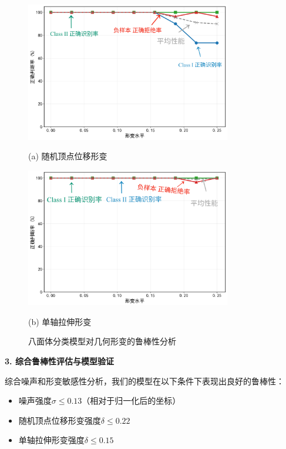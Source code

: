     \begin{figure}[H]
        \centering
\begin{minipage}{\textwidth}
    \centering
    \includegraphics[width=0.8\textwidth]{figures2/robustness/octahedron_robustness_random_vertex_disp.png}
    \caption*{(a) 随机顶点位移形变}
\end{minipage}

\begin{minipage}{\textwidth}
    \centering
    \includegraphics[width=0.8\textwidth]{figures2/robustness/octahedron_robustness_uniaxial_stretch.png}
    \caption*{(b) 单轴拉伸形变}
\end{minipage}
\caption{八面体分类模型对几何形变的鲁棒性分析}
\label{fig:octahedron_deformation_robustness}
    \end{figure}
    
\textbf{3. 综合鲁棒性评估与模型验证}
    
综合噪声和形变敏感性分析，我们的模型在以下条件下表现出良好的鲁棒性：
    \begin{itemize}
\item 噪声强度$\sigma \leq 0.13$（相对于归一化后的坐标）
\item 随机顶点位移形变强度$\delta \leq 0.22$
\item 单轴拉伸形变强度$\delta \leq 0.15$
    \end{itemize}
    

